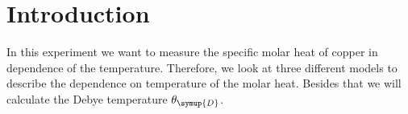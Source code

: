 \section{Introduction}
\label{sec:Ziel}

In this experiment we want to measure the specific molar heat of copper in dependence of the temperature. Therefore, we look at three 
different models to describe the dependence on temperature of the molar heat. Besides that we will calculate the Debye temperature
$\theta_{\symup{D}}$. 
